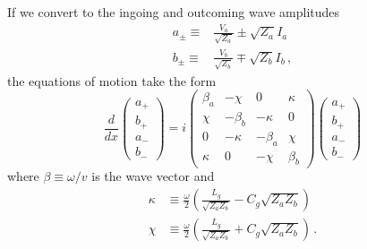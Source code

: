 If we convert to the ingoing and outcoming wave amplitudes
\begin{align}
  a_\pm \equiv& \frac{V_a}{\sqrt{Z_a}} \pm \sqrt{Z_a} I_a \nonumber \\
  b_\pm \equiv& \frac{V_b}{\sqrt{Z_b}} \mp \sqrt{Z_b} I_b \, ,
\end{align}
the equations of motion take the form
\begin{equation}
  \frac{d}{dx} \left(
    \begin{array}{c}
      a_+ \\ b_+ \\ a_- \\ b_-
    \end{array}
  \right)
  =
  i \left(
    \begin{array}{cccc}
      \beta_a & -\chi & 0 & \kappa \\
      \chi & - \beta_b & -\kappa & 0 \\
      0 & -\kappa & -\beta_a & \chi \\
      \kappa & 0 & - \chi & \beta_b
    \end{array}
  \right)
  \left(
    \begin{array}{c}
      a_+ \\ b_+ \\ a_- \\ b_-
    \end{array}
  \right)
\end{equation}
where $\beta \equiv \omega / v$ is the wave vector and
\begin{align}
  \kappa &\equiv \frac{\omega}{2} \left( \frac{L_g}{\sqrt{Z_a Z_b}} - C_g \sqrt{Z_a Z_b} \right) \nonumber \\
  \chi &\equiv \frac{\omega}{2} \left( \frac{L_g}{\sqrt{Z_a Z_b}} + C_g \sqrt{Z_a Z_b} \right) \, .
\end{align}
